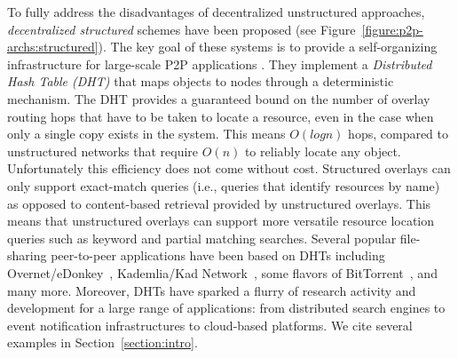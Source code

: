 To fully address the disadvantages of decentralized unstructured approaches,
\emph{decentralized structured} schemes have been proposed (see
Figure~\ref{figure:p2p-archs:structured}). The key goal of these systems is to
provide a self-organizing infrastructure for large-scale P2P applications
\cite{ratnasamy_can_2001,stoica_chord_2001,antony_pastry_2001,zhao_tapestry_2001,maymounkov_kademlia_2002,rgrk_bamboo_2004}.
They implement a \emph{Distributed Hash Table (DHT)} that maps objects to nodes
through a deterministic mechanism. The DHT provides a guaranteed bound on the
number of overlay routing hops that have to be taken to locate a resource, even
in the case when only a single copy exists in the system.  This means
$O \left( log n \right)$ hops, compared to unstructured networks that require
$O \left( n \right)$ to reliably locate any object. Unfortunately this
efficiency does not come without cost. Structured overlays can only support
exact-match queries (i.e., queries that identify resources by name) as opposed
to content-based retrieval provided by unstructured overlays. This means
that unstructured overlays can support more versatile resource location queries
such as keyword and partial matching searches. Several popular file-sharing
peer-to-peer applications have been based on DHTs including
Overnet/eDonkey~\cite{overnet}, Kademlia/Kad
Network~\cite{maymounkov_kademlia_2002}, some flavors of
BitTorrent~\cite{c_bittorrent_2003}, and many more.  Moreover, DHTs have sparked
a flurry of research activity and development for a large range of applications:
from distributed search engines to event notification infrastructures to
cloud-based platforms. We cite several examples in Section~\ref{section:intro}.

